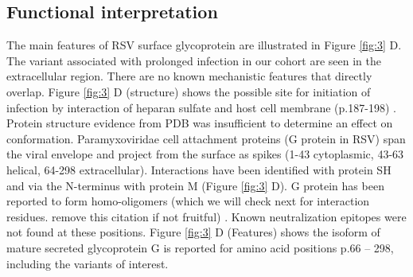 \documentclass{article} %
\begin{document}
\subsection{Functional interpretation}
The main features of RSV surface glycoprotein are illustrated in Figure \ref{fig:3} D.
The variant associated with prolonged infection in our cohort are seen in the extracellular region. 
There are no known mechanistic features that directly overlap. 
Figure \ref{fig:3} D (structure) shows the possible site for initiation of infection by interaction of heparan sulfate and host cell membrane (p.187-198)
\cite{levine1987demonstration, feldman1999identification, feldman2000fusion}.
Protein structure evidence from PDB was insufficient to determine an effect on conformation. 
Paramyxoviridae cell attachment proteins (G protein in RSV) span the viral envelope and project from the surface as spikes 
(1-43 cytoplasmic, 43-63 helical, 64-298 extracellular).
Interactions  have been identified with protein SH 
\cite{rixon2005respiratory} 
and via the N-terminus with protein M 
\cite{ghildyal2005interaction} (Figure \ref{fig:3} D).
G protein has been reported to form homo-oligomers (which we will check next for interaction residues. remove this citation if not fruitful)
\cite{collins1992oligomerization}.
Known neutralization epitopes were not found at these positions.
Figure \ref{fig:3} D (Features) shows the isoform of mature secreted glycoprotein G is reported for amino acid positions p.66 – 298, including the variants of interest.
\end{document}
